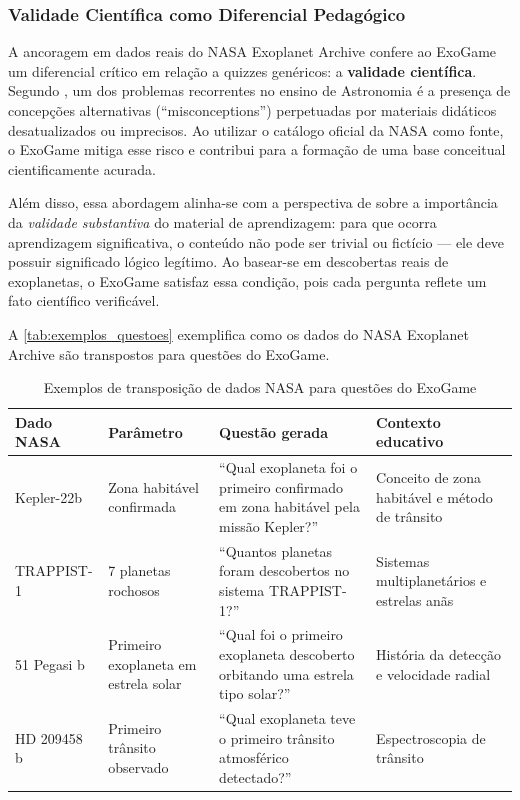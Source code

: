 \documentclass[
	12pt,
	openany,
	oneside,
	a4paper,
	english,
	brazil
]{abntex2}
\begin{document}
\subsubsection{Validade Científica como Diferencial Pedagógico}

A ancoragem em dados reais do NASA Exoplanet Archive confere ao ExoGame um diferencial crítico em relação a quizzes genéricos: a \textbf{validade científica}. Segundo , um dos problemas recorrentes no ensino de Astronomia é a presença de concepções alternativas (``misconceptions'') perpetuadas por materiais didáticos desatualizados ou imprecisos. Ao utilizar o catálogo oficial da NASA como fonte, o ExoGame mitiga esse risco e contribui para a formação de uma base conceitual cientificamente acurada.

Além disso, essa abordagem alinha-se com a perspectiva de  sobre a importância da \textit{validade substantiva} do material de aprendizagem: para que ocorra aprendizagem significativa, o conteúdo não pode ser trivial ou fictício --- ele deve possuir significado lógico legítimo. Ao basear-se em descobertas reais de exoplanetas, o ExoGame satisfaz essa condição, pois cada pergunta reflete um fato científico verificável.

A \autoref{tab:exemplos_questoes} exemplifica como os dados do NASA Exoplanet Archive são transpostos para questões do ExoGame.

\begin{table}[htb]
\caption{\label{tab:exemplos_questoes}Exemplos de transposição de dados NASA para questões do ExoGame}
\begin{tabular}{p{2.5cm}|p{3.5cm}|p{4cm}|p{3.5cm}}
  \toprule
  \textbf{Dado NASA} & \textbf{Parâmetro} & \textbf{Questão gerada} & \textbf{Contexto educativo} \\
  \midrule
  Kepler-22b & Zona habitável confirmada & ``Qual exoplaneta foi o primeiro confirmado em zona habitável pela missão Kepler?'' & Conceito de zona habitável e método de trânsito \\
  \midrule
  TRAPPIST-1 & 7 planetas rochosos & ``Quantos planetas foram descobertos no sistema TRAPPIST-1?'' & Sistemas multiplanetários e estrelas anãs \\
  \midrule
  51 Pegasi b & Primeiro exoplaneta em estrela solar & ``Qual foi o primeiro exoplaneta descoberto orbitando uma estrela tipo solar?'' & História da detecção e velocidade radial \\
  \midrule
  HD 209458 b & Primeiro trânsito observado & ``Qual exoplaneta teve o primeiro trânsito atmosférico detectado?'' & Espectroscopia de trânsito \\
  \bottomrule
\end{tabular}
\end{table}
\end{document}
